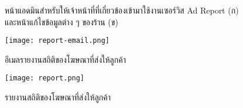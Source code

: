 \begin{figure}[!h]
	\centering
	\caption{หน้าแอดมินสำหรับให้เจ้าหน้าที่ที่เกี่ยวข้องเข้ามาใช้งานเซอร์วิส Ad Report (ก) และหน้าแก้ไขข้อมูลต่าง ๆ ของร้าน (ข)}
	\label{Fig:adminui}
\end{figure}

\begin{figure}[!h]
	\centering
	\texttt{[image: report-email.png]}  
	\caption{อีเมลรายงานสถิติของโฆษณาที่ส่งให้ลูกค้า}
	\label{Fig:report-email}
\end{figure}

\begin{figure}[!p]
	\centering
	\texttt{[image: report.png]}  
	\caption{รายงานสถิติของโฆษณาที่ส่งให้ลูกค้า}
	\label{Fig:report}
\end{figure}
